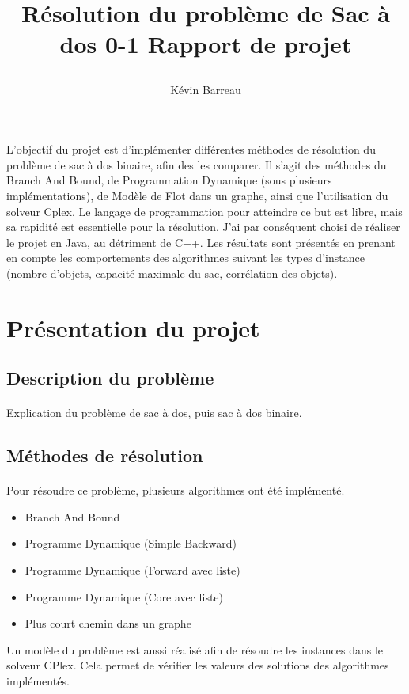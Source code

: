 \documentclass[12pt]{article}
\title{
 \begin{minipage}\linewidth
        \centering
        Résolution du problème de Sac à dos 0-1
        \vskip3pt
        \large Rapport de projet
    \end{minipage}
 }
\author{Kévin Barreau}
\begin{document}
\maketitle

\abstract
L'objectif du projet est d'implémenter différentes méthodes de résolution du problème de sac à dos binaire, afin des les comparer. Il s'agit des méthodes du Branch And Bound, de Programmation Dynamique (sous plusieurs implémentations), de Modèle de Flot dans un graphe, ainsi que l'utilisation du solveur Cplex. Le langage de programmation pour atteindre ce but est libre, mais sa rapidité est essentielle pour la résolution. J'ai par conséquent choisi de réaliser le projet en Java, au détriment de C++. Les résultats sont présentés en prenant en compte les comportements des algorithmes suivant les types d'instance (nombre d'objets, capacité maximale du sac, corrélation des objets).

\newpage

\renewcommand{\contentsname}{Sommaire} 
\tableofcontents

\newpage

\section{Présentation du projet}

\subsection{Description du problème}

\paragraph{}Explication du problème de sac à dos, puis sac à dos binaire.

\subsection{Méthodes de résolution}

\paragraph{}Pour résoudre ce problème, plusieurs algorithmes ont été implémenté.
\begin{itemize}
	\item Branch And Bound
	\item Programme Dynamique (Simple Backward)
	\item Programme Dynamique (Forward avec liste)
	\item Programme Dynamique (Core avec liste)
	\item Plus court chemin dans un graphe
\end{itemize}
Un modèle du problème est aussi réalisé afin de résoudre les instances dans le solveur CPlex. Cela permet de vérifier les valeurs des solutions des algorithmes implémentés.
\end{document}
